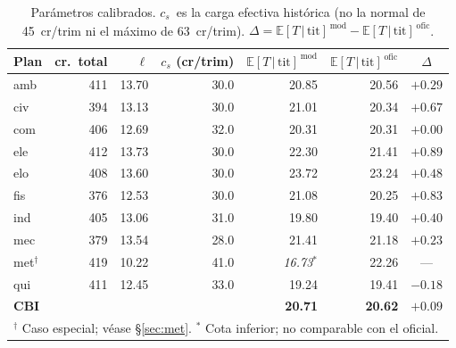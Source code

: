 \documentclass[11pt,letterpaper]{article}
\newcommand{\ETtit}{\mathbb{E}[T\,|\,\mathrm{tit}]}
\begin{document}
\begin{table}[H]\centering
\caption{Parámetros calibrados.
         $c_s$~es la carga efectiva histórica (no la normal de 45~cr/trim ni el máximo de 63~cr/trim).
         $\Delta = \ETtit^{\,\mathrm{mod}} - \ETtit^{\,\mathrm{ofic}}$.}
\label{tab:calibracion}
\small
\begin{tabular}{lrrrrrc}
\toprule
Plan & cr.\ total & $\ell$ & $c_s$ (cr/trim) &
      $\ETtit^{\,\mathrm{mod}}$ & $\ETtit^{\,\mathrm{ofic}}$ & $\Delta$ \\
\midrule
amb &  411 & 13.70 & 30.0 & 20.85 & 20.56 & $+0.29$ \\
civ &  394 & 13.13 & 30.0 & 21.01 & 20.34 & $+0.67$ \\
com &  406 & 12.69 & 32.0 & 20.31 & 20.31 & $+0.00$ \\
ele &  412 & 13.73 & 30.0 & 22.30 & 21.41 & $+0.89$ \\
elo &  408 & 13.60 & 30.0 & 23.72 & 23.24 & $+0.48$ \\
fis &  376 & 12.53 & 30.0 & 21.08 & 20.25 & $+0.83$ \\
ind &  405 & 13.06 & 31.0 & 19.80 & 19.40 & $+0.40$ \\
mec &  379 & 13.54 & 28.0 & 21.41 & 21.18 & $+0.23$ \\
met$^\dagger$ & 419 & 10.22 & 41.0 &
      \textit{16.73}$^{*}$ & 22.26 & --- \\
qui &  411 & 12.45 & 33.0 & 19.24 & 19.41 & $-0.18$ \\
\midrule
\textbf{CBI} & & & & \textbf{20.71} & \textbf{20.62} & $+0.09$ \\
\bottomrule
\multicolumn{7}{l}{\footnotesize
  $^\dagger$ Caso especial; véase §\ref{sec:met}.\enspace
  $^{*}$ Cota inferior; no comparable con el oficial.}
\end{tabular}
\end{table}
\end{document}
